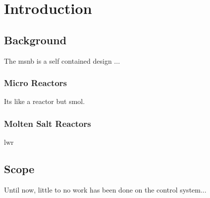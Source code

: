 \chapter{Introduction}
\label{Chapter:Introduction}

\section{Background}
The \acf{msnb} is a self contained design \cite{CarterPHD,PetersonMS}... 

\subsection{Micro Reactors}
Its like a reactor but smol.

\subsection{Molten Salt Reactors}
\acf{lwr}


\section{Scope}
Until now, little to no work has been done on the control system... 
